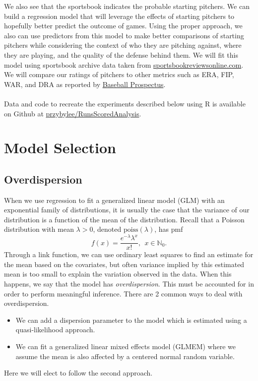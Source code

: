\documentclass [52pt] {article}
\newcommand{\N}{\mathbb{N}}
\begin{document}
We also see that the sportsbook indicates the probable starting pitchers.  We can build a regression model that will leverage the effects of starting pitchers to hopefully better predict the outcome of games.  Using the proper approach, we also can use predictors from this model to make better comparisons of starting pitchers while considering the context of who they are pitching against, where they are playing, and the quality of the defense behind them.  We will fit this model using sportsbook archive data  taken from \href{https://www.sportsbookreviewsonline.com/scoresoddsarchives/mlb/mlboddsarchives.htm}{sportsbookreviewsonline.com}.  We will compare our ratings of pitchers to other metrics such as ERA, FIP, WAR, and DRA as reported by \href{https://www.baseballprospectus.com/leaderboards/pitching/}{Baseball Prospectus}.  
\\\\
Data and code to recreate the experiments described below using R is available on Github at \href{https://github.com/przybylee/RunsScoredAnalysis}{przybylee/RunsScoredAnalysis}.

\section{Model Selection}

\subsection{Overdispersion}

When we use regression to fit a generalized linear model (GLM) with an exponential family of distributions, it is usually the case that the variance of our distribution is a function of the mean of the distribution.  Recall that a Poisson distribution with mean $\lambda>0$, denoted $\text{poiss}(\lambda)$, has pmf
\[f(x) = \frac{e^{-\lambda}\lambda^x}{x!},\:\:x\in\N_0.\]
Through a link function, we can use ordinary least squares to find an estimate for the mean based on the covariates, but often variance implied by this estimated mean is too small to explain the variation observed in the data.  When this happens, we say that the model has \emph{overdispersion}.  This must be accounted for in order to perform meaningful inference.  There are 2 common ways to deal with overdispersion.
\begin{itemize}
\item We can add a dispersion parameter to the model which is estimated using a quasi-likelihood approach.
\item We can fit a generalized linear mixed effects model (GLMEM) where we assume the mean is also affected by a centered normal random variable. 
\end{itemize}
Here we will elect to follow the second approach.
\end{document}
